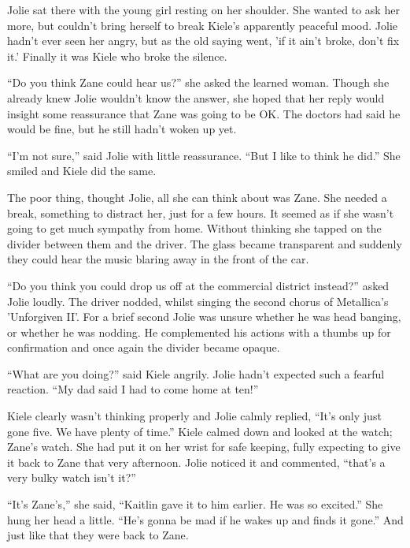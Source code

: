 \thoughtbreak



Jolie sat there with the young girl resting on her shoulder.  She wanted to ask her more, but couldn't bring herself to break Kiele's apparently peaceful mood.  Jolie hadn't ever seen her angry, but as the old saying went, 'if it ain't broke, don't fix it.'  Finally it was Kiele who broke the silence.  

``Do you think Zane could hear us?'' she asked the learned woman.  Though she already knew Jolie wouldn't know the answer, she hoped that her reply would insight some reassurance that Zane was going to be OK.  The doctors had said he would be fine, but he still hadn't woken up yet.

``I'm not sure,'' said Jolie with little reassurance.  ``But I like to think he did.''  She smiled and Kiele did the same.

The poor thing, thought Jolie, all she can think about was Zane.  She needed a break, something to distract her, just for a few hours.  It seemed as if she wasn't going to get much sympathy from home.  Without thinking she tapped on the divider between them and the driver.  The glass became transparent and suddenly they could hear the music blaring away in the front of the car.

``Do you think you could drop us off at the commercial district instead?'' asked Jolie loudly.  The driver nodded, whilst singing the second chorus of Metallica's 'Unforgiven II'.  For a brief second Jolie was unsure whether he was head banging, or whether he was nodding.  He complemented his actions with a thumbs up for confirmation and once again the divider became opaque.  

``What are you doing?'' said Kiele angrily.  Jolie hadn't expected such a fearful reaction.  ``My dad said I had to come home at ten!''  

Kiele clearly wasn't thinking properly and Jolie calmly replied, ``It's only just gone five.  We have plenty of time.''  Kiele calmed down and looked at the watch; Zane's watch.  She had put it on her wrist for safe keeping, fully expecting to give it back to Zane that very afternoon.  Jolie noticed it and commented, ``that's a very bulky watch isn't it?'' 

``It's Zane's,'' she said, ``Kaitlin gave it to him earlier.  He was so excited.''  She hung her head a little.  ``He's gonna be mad if he wakes up and finds it gone.''  And just like that they were back to Zane.



